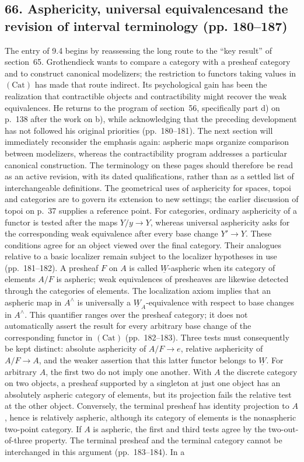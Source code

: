 \subsection*{66. Asphericity, universal equivalences\newline and the revision of interval terminology (pp. 180--187)}
The entry of 9.4 begins by reassessing the long route to the ``key result'' of section~65. Grothendieck wants to compare a category with a presheaf category and to construct canonical modelizers; the restriction to functors taking values in $(\mathrm{Cat})$ has made that route indirect. Its psychological gain has been the realization that contractible objects and contractibility might recover the weak equivalences. He returns to the program of section~56, specifically part d) on p.~138 after the work on b), while acknowledging that the preceding development has not followed his original priorities (pp.~180--181). The next section will immediately reconsider the emphasis again: aspheric maps organize comparison between modelizers, whereas the contractibility program addresses a particular canonical construction. The terminology on these pages should therefore be read as an active revision, with its dated qualifications, rather than as a settled list of interchangeable definitions. The geometrical uses of asphericity for spaces, topoi and categories are to govern its extension to new settings; the earlier discussion of topoi on p.~37 supplies a reference point. For categories, ordinary asphericity of a functor is tested after the maps $Y/y\to Y$, whereas universal asphericity asks for the corresponding weak equivalence after every base change $Y'\to Y$. These conditions agree for an object viewed over the final category. Their analogues relative to a basic localizer remain subject to the localizer hypotheses in use (pp.~181--182). A presheaf $F$ on $A$ is called $\underline W$-aspheric when its category of elements $A/F$ is aspheric; weak equivalences of presheaves are likewise detected through the categories of elements. The localization axiom implies that an aspheric map in $A^\wedge$ is universally a $\underline W_A$-equivalence with respect to base changes in $A^\wedge$. This quantifier ranges over the presheaf category; it does not automatically assert the result for every arbitrary base change of the corresponding functor in $(\mathrm{Cat})$ (pp.~182--183). Three tests must consequently be kept distinct: absolute asphericity of $A/F\to e$, relative asphericity of $A/F\to A$, and the weaker assertion that this latter functor belongs to $\underline W$. For arbitrary $A$, the first two do not imply one another. With $A$ the discrete category on two objects, a presheaf supported by a singleton at just one object has an absolutely aspheric category of elements, but its projection fails the relative test at the other object. Conversely, the terminal presheaf has identity projection to $A$, hence is relatively aspheric, although its category of elements is the nonaspheric two-point category. If $A$ is aspheric, the first and third tests agree by the two-out-of-three property. The terminal presheaf and the terminal category cannot be interchanged in this argument (pp.~183--184). In a 